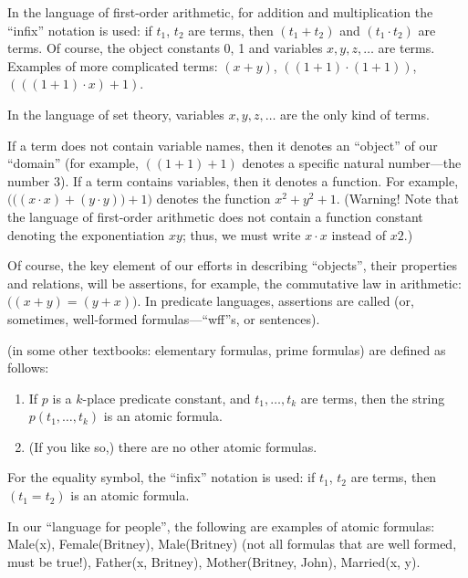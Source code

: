 \begin{example}
In the language of first-order arithmetic, for addition and multiplication the ``infix'' notation is used: if \(t_1\), \(t_2\) are terms, then \((t_1+t_2)\) and \((t_1\cdot t_2)\) are terms.
Of course, the object constants 0, 1 and variables \(x, y, z, \ldots\) are terms.
Examples of more complicated terms: \((x+y)\), \(((1+1)\cdot (1+1))\), \((((1+1)\cdot x)+1)\).
\end{example}

\begin{example}
In the language of set theory, variables \(x, y, z, \ldots\)  are the only kind of terms.
\end{example}

If a term does not contain variable names, then it denotes an ``object'' of our ``domain'' (for example, \(((1+1)+1)\) denotes a specific natural number---the number 3).
If a term contains variables, then it denotes a function.
For example, \(\Big(\big((x\cdot x)+(y\cdot y)\big)+1\Big)\) denotes the function \(x^2+y^2+1.\)
(Warning! Note that the language of first-order arithmetic does not contain a function constant denoting the exponentiation \(xy\); thus, we must write \(x\cdot x\) instead of \(x2\).)

Of course, the key element of our efforts in describing ``objects'', their properties and relations, will be assertions, for example, the commutative law in arithmetic: \(\big((x+y)=(y+x)\big)\).
In predicate languages, assertions are called  (or, sometimes, well-formed formulas---``wff''s, or sentences).

 (in some other textbooks: elementary formulas, prime formulas) are defined as follows:

\begin{enumerate}
    \item If \(p\) is a \(k\)-place predicate constant, and \(t_1, \ldots , t_k\) are terms, then the string \(p(t_1, \ldots , t_k)\) is an atomic formula.
    \item (If you like so,) there are no other atomic formulas.
\end{enumerate}
For the equality symbol, the ``infix'' notation is used: if \(t_1\), \(t_2\) are terms, then \((t_1=t_2)\) is an atomic formula.

\begin{example}
In our ``language for people'', the following are examples of atomic formulas: Male(x), Female(Britney), Male(Britney) (not all formulas that are well formed, must be true!), Father(x, Britney), Mother(Britney, John), Married(x, y).
\end{example}


